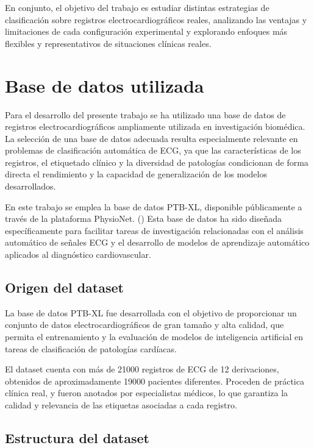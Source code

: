 \documentclass[12pt,a4paper,twoside]{book}
\begin{document}
En conjunto, el objetivo del trabajo es estudiar distintas estrategias de clasificación sobre registros electrocardiográficos reales, analizando las ventajas y limitaciones de cada configuración experimental y explorando enfoques más flexibles y representativos de situaciones clínicas reales.

\section{Base de datos utilizada}

Para el desarrollo del presente trabajo se ha utilizado una base de datos de registros electrocardiográficos ampliamente utilizada en investigación biomédica. 
La selección de una base de datos adecuada resulta especialmente relevante en problemas de clasificación automática de ECG, ya que las características de los registros, el etiquetado clínico y la diversidad de patologías condicionan de forma directa el rendimiento y la capacidad de generalización de los modelos desarrollados.

En este trabajo se emplea la base de datos PTB-XL, disponible públicamente a través de la plataforma PhysioNet.  (\cite{ptbxl_dataset})
Esta base de datos ha sido diseñada específicamente para facilitar tareas de investigación relacionadas con el análisis automático de señales ECG y el desarrollo de modelos de aprendizaje automático aplicados al diagnóstico cardiovascular.

\subsection{Origen del dataset}

La base de datos PTB-XL fue desarrollada con el objetivo de proporcionar un conjunto de datos electrocardiográficos de gran tamaño y alta calidad, que permita el entrenamiento y la evaluación de modelos de inteligencia artificial en tareas de clasificación de patologías cardíacas.

El dataset cuenta con más de 21000 registros de ECG de 12 derivaciones, obtenidos de aproximadamente 19000 pacientes diferentes.
Proceden de práctica clínica real, y fueron anotados por especialistas médicos, lo que garantiza la calidad y relevancia de las etiquetas asociadas a cada registro.

\subsection{Estructura del dataset}
\end{document}
